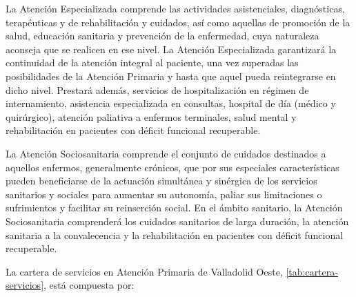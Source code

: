 La Atención Especializada comprende las actividades asistenciales, diagnósticas, terapéuticas y de rehabilitación y cuidados, así como aquellas de promoción de la salud, educación sanitaria y prevención de la enfermedad, cuya naturaleza aconseja que se realicen en ese nivel.
La Atención Especializada garantizará la continuidad de la atención integral al paciente, una vez superadas las posibilidades de la Atención Primaria y hasta que aquel pueda reintegrarse en dicho nivel.
Prestará además, servicios de hospitalización en régimen de internamiento, asistencia especializada en consultas, hospital de día (médico y quirúrgico), atención paliativa a enfermos terminales, salud mental y rehabilitación en pacientes con déficit funcional recuperable.

La Atención Sociosanitaria comprende el conjunto de cuidados destinados a aquellos enfermos, generalmente crónicos, que por sus especiales características pueden beneficiarse de la actuación simultánea y sinérgica de los servicios sanitarios y sociales para aumentar su autonomía, paliar sus limitaciones o sufrimientos y facilitar su reinserción social.
En el ámbito sanitario, la Atención Sociosanitaria comprenderá los cuidados sanitarios de larga duración, la atención sanitaria a la convalecencia y la rehabilitación en pacientes con déficit funcional recuperable.

La cartera de servicios en Atención Primaria de Valladolid Oeste, \cref{tab:cartera-servicios}, está compuesta por:

